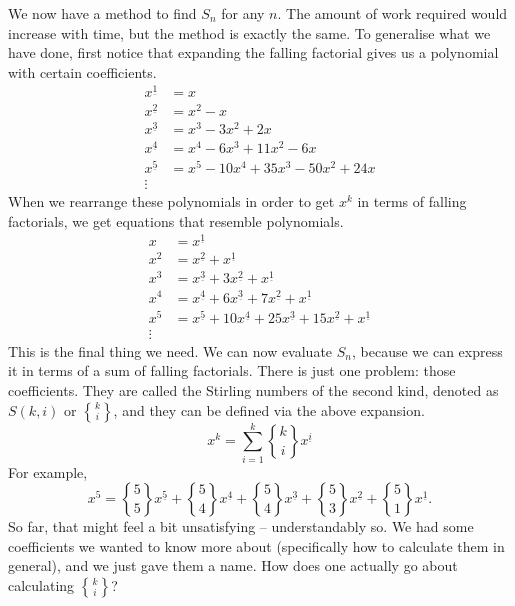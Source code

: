 \documentclass[a4paper]{article}
\theoremstyle{definition}
\begin{document}
We now have a method to find $S_n$ for any $n$.
The amount of work required would increase with time, but the method is exactly the same.
To generalise what we have done, first notice that expanding the falling factorial gives us a polynomial with certain coefficients.
\begin{align*}
    x^{\underline{1}} & = x                                     \\
    x^{\underline{2}} & = x^2 - x                               \\
    x^{\underline{3}} & = x^3 - 3x^2 + 2x                       \\
    x^{\underline{4}} & = x^{4} - 6 x^3 + 11 x^2 - 6 x          \\
    x^{\underline{5}} & = x^5 - 10 x^4 + 35 x^3 - 50 x^2 + 24 x \\
    \vdots
\end{align*}
When we rearrange these polynomials in order to get $x^k$ in terms of falling factorials, we get equations that resemble polynomials.
\begin{align*}
    x   & = x^{\underline{1}}                                                                                          \\
    x^2 & = x^{\underline{2}} + x^{\underline{1}}                                                                      \\
    x^3 & = x^{\underline{3}} + 3 x^{\underline{2}} + x^{\underline{1}}                                                \\
    x^4 & = x^{\underline{4}} + 6 x^{\underline{3}} + 7 x^{\underline{2}} + x^{\underline{1}}                          \\
    x^5 & = x^{\underline{5}} + 10 x^{\underline{4}} + 25 x^{\underline{3}} + 15 x^{\underline{2}} + x^{\underline{1}} \\
    \vdots
\end{align*}
This is the final thing we need.
We can now evaluate $S_n$, because we can express it in terms of a sum of falling factorials.
There is just one problem: those coefficients.
They are called the Stirling numbers of the second kind, denoted as $S(k, i)$ or $k\brace i$, and they can be defined via the above expansion.
\begin{equation}
    x^k = \sum_{i=1}^k {k\brace i} x^{\underline{i}}
\end{equation}
For example,
\begin{equation*}
    x^5 = {5\brace 5} x^{\underline{5}} + {5\brace 4} x^{\underline{4}} + {5\brace 4} x^{\underline{3}} + {5\brace 3} x^{\underline{2}} + {5\brace 1} x^{\underline{1}}.
\end{equation*}
So far, that might feel a bit unsatisfying -- understandably so.
We had some coefficients we wanted to know more about (specifically how to calculate them in general), and we just gave them a name.
How does one actually go about calculating $k\brace i$?
\end{document}

